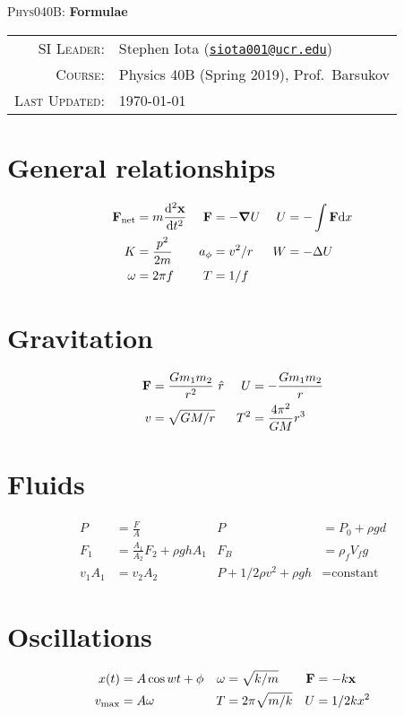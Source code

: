 \documentclass[11pt]{article}
\newcommand{\email}[1]{\texttt{\href{mailto:#1}{#1}}}
\begin{document}
\begin{center}

\Large{\textsc{Phys040B}: \textbf{Formulae}}
\end{center}
\vspace{.5mm}



\begin{tabular}{rl}
\textsc{SI Leader}:
&
Stephen Iota (\email{siota001@ucr.edu})
\\
\textsc{Course}:
&
Physics 40B (Spring 2019), Prof.~Barsukov
\\
\textsc{Last Updated}:
&
\today
\end{tabular}


\section{General relationships}

\begin{align*}
\vb{F}_{\text{net}} &= m\dv[2]{\vb{x}}{t}
&
\vb{F} &= -\grad{U}
&
U &= -\int \vb{F} \text{d}x
\\
K &= \frac{p^2}{2m}
&
a_\phi &= v^2/r
&
W &= -\Delta U
\\
\omega &= 2\pi f
&
T &= 1/f
\end{align*}



\section{Gravitation}

\begin{align*}
\vb{F} &= \frac{Gm_1m_2}{r^2} \ \hat{r}
&
U &= -\frac{Gm_1m_2}{r}
\\
v &= \sqrt{GM/r}
&
T^2 &= \frac{4\pi^2}{GM}r^3
\\
\end{align*}




\section{Fluids}


\begin{align*}
P &= \frac{F}{A}
&
P &= P_0 + \rho gd
\\
F_1 &= \frac{A_1}{A_2} F_2 + \rho ghA_1
&
F_B &= \rho_f V_fg
\\
v_1A_1 &= v_2A_2
&
P + 1/2\rho v^2 + \rho gh &= \text{constant}
\end{align*}




\section{Oscillations}

\begin{align*}
x(t) &= A\cos{wt+\phi}
&
\omega &= \sqrt{k/m}
&
\vb{F} &= -k\vb{x}
\\
v_{\text{max}} &= A\omega
&
T &= 2\pi \sqrt{m/k}
&
U &= 1/2kx^2
\end{align*}
\end{document}

